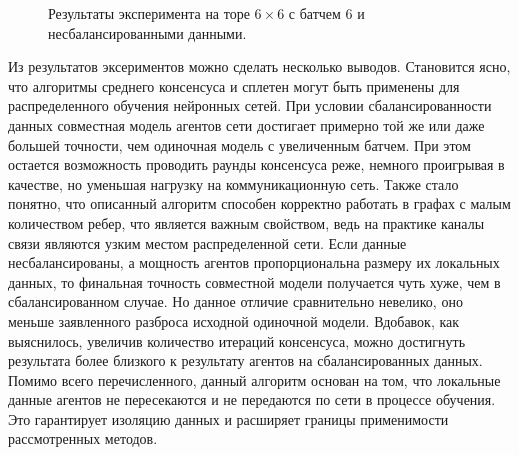 \documentclass[a4paper,article,14pt]{extarticle}
\begin{document}
\begin{figure}[H]
\begin{center}
\caption{ \label{fig:torus6x6_unbalanced_b6}
     Результаты эксперимента на торе $6\times 6$ с батчем 6 и несбалансированными данными.}
\end{center}
\end{figure}

\pagebreak
{}
Из результатов эксериментов можно сделать несколько выводов. Становится ясно, что алгоритмы среднего консенсуса и сплетен могут быть применены для распределенного обучения нейронных сетей. При условии сбалансированности данных совместная модель агентов сети достигает примерно той же или даже большей точности, чем одиночная модель с увеличенным батчем. При этом остается возможность проводить раунды консенсуса реже, немного проигрывая в качестве, но уменьшая нагрузку на коммуникационную сеть. Также стало понятно, что описанный алгоритм способен корректно работать в графах с малым количеством ребер, что является важным свойством, ведь на практике каналы связи являются узким местом распределенной сети. Если данные несбалансированы, а мощность агентов пропорциональна размеру их локальных данных, то финальная точность совместной модели получается чуть хуже, чем в сбалансированном случае. Но данное отличие сравнительно невелико, оно меньше заявленного разброса исходной одиночной модели. Вдобавок, как выяснилось, увеличив количество итераций консенсуса, можно достигнуть результата более близкого к результату агентов на сбалансированных данных. Помимо всего перечисленного, данный алгоритм основан на том, что локальные данные агентов не пересекаются и не передаются по сети в процессе обучения. Это гарантирует изоляцию данных и расширяет границы применимости рассмотренных методов.
\end{document}

